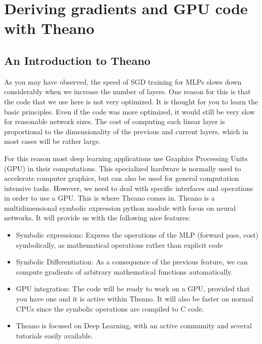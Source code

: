 \section{Deriving gradients and GPU code with Theano}

\subsection{An Introduction to Theano}

As you may have observed, the speed of SGD training for MLPs slows down
considerably when we increase the number of layers. One reason for this is that
the code that we use here is not very optimized. It is thought for you to
learn the basic principles. Even if the code was more optimized, it would still be
very slow for reasonable network sizes. The cost of computing each
linear layer is proportional to the dimensionality of the previous and current
layers, which in most cases will be rather large. 

For this reason most deep learning applications use Graphics Processing Units
(GPU) in their computations. This specialized hardware is normally used to
accelerate computer graphics, but can also be used for general computation
intensive tasks. However, we need to deal with specific interfaces and
operations in order to use a GPU. This is where Theano comes in. Theano is a
multidimensional symbolic expression python module with focus on neural
networks. It will provide us with the following nice features:

\begin{itemize}
\item Symbolic expressions: Express the operations of the MLP (forward pass, cost) symbolically, as mathematical operations rather than explicit code 
\item Symbolic Differentiation: As a consequence of the previous feature, we can compute gradients of arbitrary mathematical functions automatically.   
\item GPU integration: The code will be ready to work on a GPU, provided that you have one and it is active within Theano. It will also be faster on normal CPUs since the symbolic operations are compiled to C code. 
\item Theano is focused on Deep Learning, with an active community and several tutorials easily available.  
\end{itemize}

